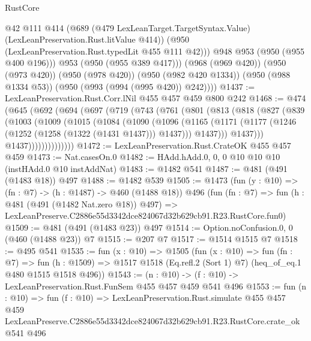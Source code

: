 \begin{lexlean}{RustCore}
\begin{coremodule}
              @42
              @111
              @414
              (@689
                (@479 LexLeanTarget.TargetSyntax.Value)
                (LexLeanPreservation.Rust.litValue @414))
              (@950 (LexLeanPreservation.Rust.typedLit @455 @111 @42)))
            @948
            @953
            (@950 (@955 @400 @196)))
          @953
          (@950 (@955 @389 @417)))
        (@968 (@969 @420))
        (@950 (@973 @420))
        (@950 (@978 @420))
        (@950 (@982 @420 @1334))
        (@950 (@988 @1334 @53))
        (@950 (@993 (@994 (@995 @420)) @242))))
@1437 := LexLeanPreservation.Rust.Corr.lNil @455 @457 @459 @800 @242
@1468 := @474
    (@645
      (@692
        (@694
          (@697
            (@719
              (@743
                (@761
                  (@801
                    (@813
                      (@818
                        (@827
                          (@839
                            (@1003
                              (@1009
                                (@1015
                                  (@1084
                                    (@1090
                                      (@1096
                                        (@1165
                                          (@1171
                                            (@1177
                                              (@1246 (@1252 (@1258 (@1322 (@1431 @1437))) @1437)))
                                            @1437)))
                                      @1437)))
                                @1437))))))))))))))
@1472 := LexLeanPreservation.Rust.CrateOK @455 @457 @459
@1473 := Nat.casesOn.{0}
@1482 := HAdd.hAdd.{0, 0, 0} @10 @10 @10 (instHAdd.{0} @10 instAddNat)
@1483 := @1482 @541
@1487 := @481 (@491 (@1483 @18)) @497
@1488 := @1482 @539
@1505 := @1473
    (fun (y : @10) => (fn : @7) -> (h : @1487) -> @460 (@1488 @18))
    @496
    (fun (fn : @7) =>
    fun (h : @481 (@491 (@1482 Nat.zero @18)) @497) =>
    LexLeanPreserve.C2886e55d3342dce824067d32b629cb91.R23.RustCore.fun0)
@1509 := @481 (@491 (@1483 @23)) @497
@1514 := Option.noConfusion.{0, 0} (@460 (@1488 @23)) @7
@1515 := @207 @7
@1517 := @1514 @1515 @7
@1518 := @495 @541
@1535 := fun (x : @10) =>
  @1505
    (fun (x : @10) =>
    fun (fn : @7) =>
    fun (h : @1509) => @1517 @1518 (Eq.refl.{2} (Sort 1) @7) (heq_of_eq.{1} @480 @1515 @1518 @496))
@1543 := (n : @10) -> (f : @10) -> LexLeanPreservation.Rust.FunSem @455 @457 @459 @541 @496
@1553 := fun (n : @10) =>
  fun (f : @10) =>
  LexLeanPreservation.Rust.simulate
    @455
    @457
    @459
    LexLeanPreserve.C2886e55d3342dce824067d32b629cb91.R23.RustCore.crate_ok
    @541
    @496
\end{coremodule}
\end{lexlean}
